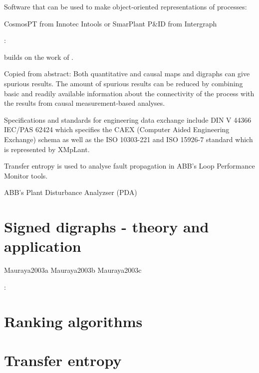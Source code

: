 \documentclass{article}
\begin{document}
Software that can be used to make object-oriented representations of processes:

CosmosPT from Innotec
Intools or SmarPlant P\&ID from Intergraph



\citet{Thambirajah2009}:

\citet{Thambirajah2009} builds on the work of \citet{Yim2006}.

Copied from abstract:
Both quantitative and causal maps and digraphs can give spurious results.
The amount of spurious results can be reduced by combining basic and readily available information about the connectivity of the process with the results from causal measurement-based analyses.

Specifications and standards for engineering data exchange include DIN V 44366 IEC/PAS 62424 which specifies the CAEX (Computer Aided Engineering Exchange) schema as well as the ISO 10303-221 and ISO 15926-7 standard which is represented by XMpLant.

Transfer entropy is used to analyse fault propagation in ABB's Loop Performance Monitor tools.

ABB's Plant Disturbance Analyzser (PDA)



\section{Signed digraphs - theory and application}

Mauraya2003a
Mauraya2003b
Mauraya2003c

\citet{RamMaurya2004}:




\section{Ranking algorithms}


\section{Transfer entropy}
\end{document}
